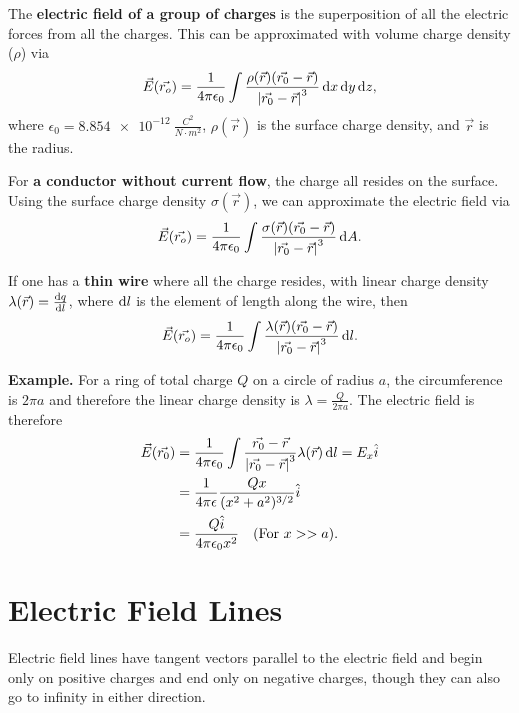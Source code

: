 The \textbf{electric field of a group of charges} is the superposition of all the electric forces from all the charges. This can be approximated with volume charge density ($\rho$) via
\begin{equation}
\vec{E}(\vec{r_o}) = \frac{1}{4\pi \epsilon_0} \int\frac{\rho(\vec{r}) (\vec{r_0} - \vec{r})}{\left| \vec{r_0} - \vec{r} \right|^3} \operatorname{d\!} x \operatorname{d\!} y \operatorname{d\!} z,
\end{equation}
where $\epsilon_0 = \SI{8.854e-12}{\frac{C^2}{N \cdot m^2}}$, $\rho(\vec{r})$ is the surface charge density, and $\vec{r}$ is the radius.

For \textbf{a conductor without current flow}, the charge all resides on the surface. Using the surface charge density $\sigma (\vec{r})$, we can approximate the electric field via
\begin{equation}
\vec{E}(\vec{r_o}) = \frac{1}{4\pi \epsilon_0} \int\frac{\sigma(\vec{r}) (\vec{r_0} - \vec{r})}{\left| \vec{r_0} - \vec{r} \right|^3} \operatorname{d\!} A.
\end{equation}

If one has a \textbf{thin wire} where all the charge resides, with linear charge density $\lambda(\vec{r}) = \frac{\operatorname{d\!} q}{\operatorname{d\!} l}$, where $\operatorname{d\!} l$ is the element of length along the wire, then
\begin{equation}
\vec{E}(\vec{r_o}) = \frac{1}{4\pi \epsilon_0} \int\frac{\lambda(\vec{r}) (\vec{r_0} - \vec{r})}{\left| \vec{r_0} - \vec{r} \right|^3} \operatorname{d\!} l.
\end{equation}

\textbf{Example.} For a ring of total charge $Q$ on a circle of radius $a$, the circumference is $2\pi a$ and therefore the linear charge density is $\lambda = \frac{Q}{2\pi a}$. The electric field is therefore
\begin{align}
    \vec{E}(\vec{r_0}) &= \frac{1}{4\pi\epsilon_0} \int \frac{\vec{r_0} - \vec{r}}{\left| \vec{r_0}-\vec{r} \right|^3} \lambda(\vec{r}) \operatorname{d\!} l  
    = E_x \hat{i} \\
    &= \frac{1}{4\pi\epsilon} \frac{Qx}{(x^2+a^2)^{3/2}}\hat{i} \\
    &= \frac{Q \hat{i}}{4\pi\epsilon_0x^2} \quad \text{(For $x >> a$)}.
\end{align}

\section{Electric Field Lines}
Electric field lines have tangent vectors parallel to the electric field and begin only on positive charges and end only on negative charges, though they can also go to infinity in either direction.

